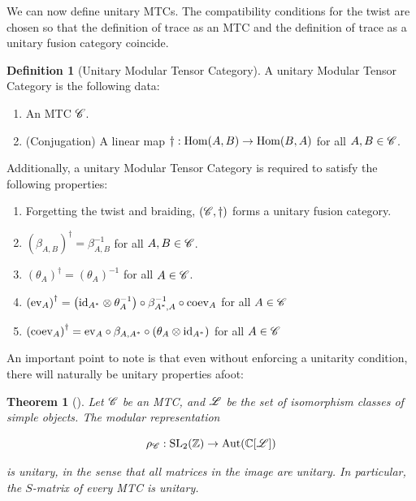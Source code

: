 \documentclass{article}
\newtheorem{theorem}{Theorem}[section]
\theoremstyle{definition}
\newtheorem*{definition}{Definition}
\numberwithin{figure}{section}
\begin{document}
We can now define unitary MTCs. The compatibility conditions for the twist are chosen so that the definition of trace as an MTC and the definition of trace as a unitary fusion category coincide.

\begin{definition}[Unitary Modular Tensor Category] A unitary Modular Tensor Category is the following data:

\begin{enumerate}
\item An MTC $\mathscr{C}$.
\item (Conjugation) A linear map $\dagger: \mathrm{Hom}(A,B)\to \mathrm{Hom}(B,A)$ for all $A,B\in \mathscr{C}$.
\end{enumerate}

Additionally, a unitary Modular Tensor Category is required to satisfy the following properties:

\begin{enumerate}
\item Forgetting the twist and braiding, $\left(\mathscr{C},\dagger\right)$ forms a unitary fusion category.
\item $\left(\beta_{A,B}\right)^{\dagger}=\beta_{A,B}^{-1}$ for all $A,B\in \mathscr{C}$.
\item $\left(\theta_A\right)^{\dagger}=\left(\theta_A\right)^{-1}$ for all $A\in \mathscr{C}$.
\item $\left(\mathrm{ev}_{A}\right)^{\dagger}= \left(\mathrm{id}_{A^*}\otimes \theta_A^{-1}\right)\circ \beta_{A^*,A}^{-1}\circ \mathrm{coev}_A$ for all $A\in \mathscr{C}$
\item $\left(\mathrm{coev}_{A}\right)^{\dagger}= \mathrm{ev}_{A}\circ\beta_{A,A^*}\circ\left(\theta_A \otimes \mathrm{id}_{A^*}\right)$ for all $A\in \mathscr{C}$
\end{enumerate}

\raggedleft\qedsymbol{}
\end{definition}

An important point to note is that even without enforcing a unitarity condition, there will naturally be unitary properties afoot:

\begin{theorem}[\cite{etingof2005fusion}] Let $\mathscr{C}$ be an MTC, and $\mathscr{L}$ be the set of isomorphism classes of simple objects. The modular representation

$$\rho_{\mathscr{C}}:\mathrm{SL}_2(\mathbb{Z})\to \mathrm{Aut}(\mathbb{C}[\mathscr{L}])$$

is unitary, in the sense that all matrices in the image are unitary. In particular, the $S$-matrix of every MTC is unitary.
\end{theorem}
\end{document}

